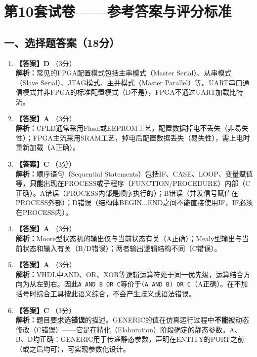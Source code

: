 \chapter{第10套试卷——参考答案与评分标准}

\section{一、选择题答案（18分）}

\begin{enumerate}[label=\arabic*.]

\item \textbf{【答案】D} \quad（3分）\\
\textbf{解析：}常见的FPGA配置模式包括主串模式（Master Serial）、从串模式（Slave Serial）、JTAG模式、主并模式（Master Parallel）等。UART串口通信模式并非FPGA的标准配置模式（D不是），FPGA不通过UART加载比特流。

\item \textbf{【答案】A} \quad（3分）\\
\textbf{解析：}CPLD通常采用Flash或EEPROM工艺，配置数据掉电不丢失（非易失性）；FPGA主流采用SRAM工艺，掉电后配置数据丢失（易失性），需上电时重新加载（A正确）。

\item \textbf{【答案】C} \quad（3分）\\
\textbf{解析：}顺序语句（Sequential Statements）包括IF、CASE、LOOP、变量赋值等，\textbf{只能}出现在PROCESS或子程序（FUNCTION/PROCEDURE）内部（C正确）。A错误（PROCESS内部是顺序执行的）；B错误（并发信号赋值在PROCESS外部）；D错误（结构体BEGIN...END之间不能直接使用IF，IF必须在PROCESS内）。

\item \textbf{【答案】A} \quad（3分）\\
\textbf{解析：}Moore型状态机的输出仅与当前状态有关（A正确）；Mealy型输出与当前状态和输入有关（B/D错误）；两者输出逻辑结构不同（C错误）。

\item \textbf{【答案】A} \quad（3分）\\
\textbf{解析：}VHDL中AND、OR、XOR等逻辑运算符处于同一优先级，运算结合方向为从左到右。因此\texttt{A AND B OR C}等价于\texttt{(A AND B) OR C}（A正确）。在不加括号时综合工具按此语义综合，不会产生歧义或语法错误。

\item \textbf{【答案】C} \quad（3分）\\
\textbf{解析：}题目要求选\textbf{错误}的描述。GENERIC的值在仿真运行过程中\textbf{不能}被动态修改（C错误）——它是在精化（Elaboration）阶段确定的静态参数。A、B、D均正确：GENERIC用于传递静态参数，声明在ENTITY的PORT之前（或之后均可），可实现参数化设计。

\end{enumerate}

